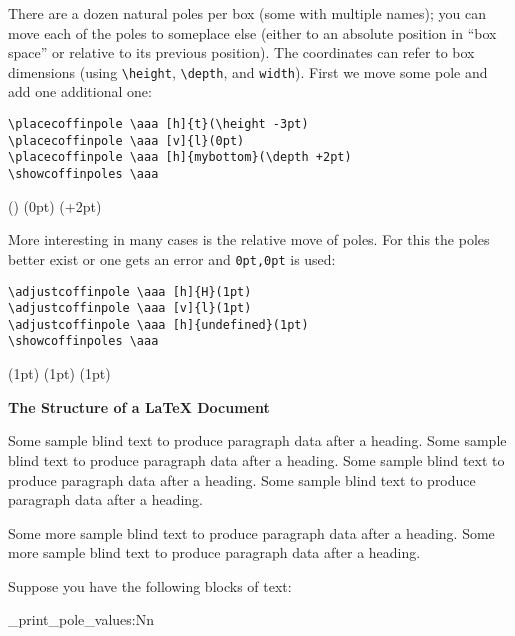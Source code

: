 \documentclass{article}
\newcommand\cbox[2][.8]{{\setlength\fboxsep{0pt}\colorbox[gray]{#1}{#2}}}
\begin{document}
There are a dozen natural poles per box (some with multiple names); you can
move each of the poles to someplace else (either to an absolute position in
``box space'' or relative to its previous position).  The coordinates can
refer to box dimensions (using \verb|\height|, \verb|\depth|,
 and \verb|width|). First we move some pole and add one
additional one:
\begin{verbatim}
\placecoffinpole \aaa [h]{t}(\height -3pt)
\placecoffinpole \aaa [v]{l}(0pt)
\placecoffinpole \aaa [h]{mybottom}(\depth +2pt)
\showcoffinpoles \aaa
\end{verbatim}
\placecoffinpole {}(\height -3pt)
\placecoffinpole {}(0pt)
\placecoffinpole {}(\depth +2pt)
\showcoffinpoles \aaa


More interesting in many cases is the relative move of poles. For this the
poles better exist or one gets an error and \texttt{0pt,0pt} is used:
\begin{verbatim}
\adjustcoffinpole \aaa [h]{H}(1pt)
\adjustcoffinpole \aaa [v]{l}(1pt)
\adjustcoffinpole \aaa [h]{undefined}(1pt)
\showcoffinpoles \aaa
\end{verbatim}
\adjustcoffinpole {}(1pt)
\adjustcoffinpole {}(1pt)
\adjustcoffinpole {}(1pt)
\showcoffinpoles \aaa


\sbox {}

\setvcoffin \bbb {11cm}
   {\raggedleft\normalfont\fontsize{36}{38pt}\bfseries 
    The Structure of a \LaTeX{} Document}

\setvcoffin \ccc {13cm}
   {Some sample blind text to produce paragraph data after a heading.
    Some sample blind text to produce paragraph data after a heading.
    Some sample blind text to produce paragraph data after a heading.
    Some sample blind text to produce paragraph data after a heading.
    \par
    Some more sample blind text to produce paragraph data after a heading.
    Some more sample blind text to produce paragraph data after a heading.
}


Suppose you have the following blocks of text:

\bigskip

\noindent\cbox{\usebox\aaa}

\begin{multicols}{2}
\ttfamily\tiny
\ExplSyntaxOn
   \noindent \coffin_print_pole_values:Nn \aaa \\ 
\ExplSyntaxOff
\end{multicols}
\end{document}
